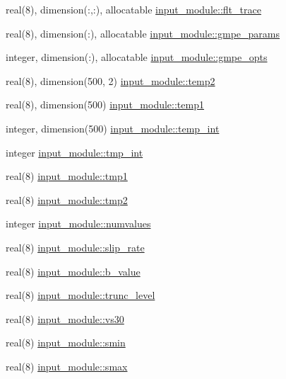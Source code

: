 \begin{DoxyCompactItemize}
real(8), dimension(\+:,\+:), allocatable \hyperlink{namespaceinput__module_a289e412144c4ad26f482d664135f3972}{input\+\_\+module\+::flt\+\_\+trace}
\item 
real(8), dimension(\+:), allocatable \hyperlink{namespaceinput__module_ab52a267c1d75b879ad598fa6cc377c4b}{input\+\_\+module\+::gmpe\+\_\+params}
\item 
integer, dimension(\+:), allocatable \hyperlink{namespaceinput__module_a1c956fb0e5942428da3bdb0c932fd10c}{input\+\_\+module\+::gmpe\+\_\+opts}
\item 
real(8), dimension(500, 2) \hyperlink{namespaceinput__module_ac72418d482bc6d9b164dc8ff77f80812}{input\+\_\+module\+::temp2}
\item 
real(8), dimension(500) \hyperlink{namespaceinput__module_a35e70ed5e2a0858cd4af8970e6b7a3fe}{input\+\_\+module\+::temp1}
\item 
integer, dimension(500) \hyperlink{namespaceinput__module_a129d3471a7d48a92476195ec540b0599}{input\+\_\+module\+::temp\+\_\+int}
\item 
integer \hyperlink{namespaceinput__module_a98528ea542cc829033364307335ecdf6}{input\+\_\+module\+::tmp\+\_\+int}
\item 
real(8) \hyperlink{namespaceinput__module_a1030c19aa6f6f484e8f538320aa753b0}{input\+\_\+module\+::tmp1}
\item 
real(8) \hyperlink{namespaceinput__module_a4344e7e8b58aa6d6e534cc25168867dc}{input\+\_\+module\+::tmp2}
\item 
integer \hyperlink{namespaceinput__module_ae55e8966862c5748b17a68539c94a6f6}{input\+\_\+module\+::numvalues}
\item 
real(8) \hyperlink{namespaceinput__module_a8c396f94a2d2aabe29bc5ba46c7c7fe0}{input\+\_\+module\+::slip\+\_\+rate}
\item 
real(8) \hyperlink{namespaceinput__module_a44ab6716b820721bceea32b98883fcdd}{input\+\_\+module\+::b\+\_\+value}
\item 
real(8) \hyperlink{namespaceinput__module_ae5dd4121bdb07e96089cd081a3017dd9}{input\+\_\+module\+::trunc\+\_\+level}
\item 
real(8) \hyperlink{namespaceinput__module_a1c64f18e0ac52016bea961845fd4f11e}{input\+\_\+module\+::vs30}
\item 
real(8) \hyperlink{namespaceinput__module_a29a8cb54fcb208499fa3cf1b30131619}{input\+\_\+module\+::smin}
\item 
real(8) \hyperlink{namespaceinput__module_a671a995c1135b6127af4ea5a418402ed}{input\+\_\+module\+::smax}
\item 

\end{DoxyCompactItemize}
